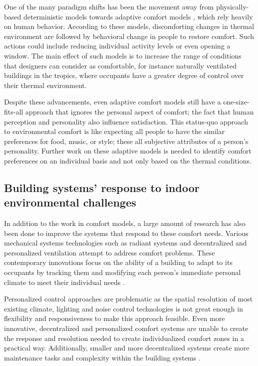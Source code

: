 \documentclass[]{interact}
\theoremstyle{plain}%
\theoremstyle{definition}
\theoremstyle{remark}
\begin{document}
One of the many paradigm shifts has been the movement away from physically-based deterministic models towards adaptive comfort models \citep{Ferrari2012AdaptiveIndices, Nicol2013AdaptiveWorld, vanHoof2010ThermalPractice}, which rely heavily on human behavior. According to these models, discomforting changes in thermal environment are followed by behavioral change in people to restore comfort. Such actions could include reducing individual activity levels or even opening a window. The main effect of such models is to increase the range of conditions that designers can consider as comfortable, for instance naturally ventilated buildings in the tropics, where occupants have a greater degree of control over their thermal environment. 

Despite these advancements, even adaptive comfort models still have a one-size-fits-all approach that ignores the personal aspect of comfort; the fact that human perception and personality also influence satisfaction. This status-quo approach to environmental comfort is like expecting all people to have the similar preferences for food, music, or style; these all subjective attributes of a person’s personality. Further work on these adaptive models is needed to identify comfort preferences on an individual basis and not only based on the thermal conditions. 






\subsection{Building systems’ response to indoor environmental challenges}
In addition to the work in comfort models, a large amount of research has also been done to improve the systems that respond to these comfort needs. Various mechanical systems technologies such as radiant systems and decentralized and personalized ventilation attempt to address comfort problems. These contemporary innovations focus on the ability of a building to adapt to its occupants by tracking them and modifying each person's immediate personal climate to meet their individual needs \citep{Brager2015EvolvingComfort}. 

Personalized control approaches are problematic as the spatial resolution of most existing climate, lighting and noise control technologies is not great enough in flexibility and responsiveness to make this approach feasible. Even more innovative, decentralized and personalized comfort systems are unable to create the response and resolution needed to create individualized comfort zones in a practical way. Additionally, smaller and more decentralized systems create more maintenance tasks and complexity within the building systems \citep{VESELY2017223} .
\end{document}
